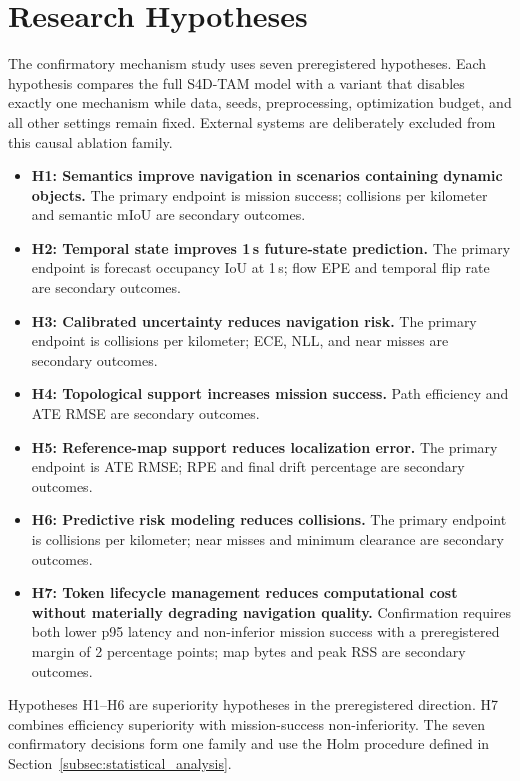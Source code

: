 \section{Research Hypotheses}
\label{sec:hypotheses}

The confirmatory mechanism study uses seven preregistered hypotheses. Each hypothesis compares the full S4D-TAM model with a variant that disables exactly one mechanism while data, seeds, preprocessing, optimization budget, and all other settings remain fixed. External systems are deliberately excluded from this causal ablation family.

\begin{itemize}
  \item \textbf{H1: Semantics improve navigation in scenarios containing dynamic objects.} The primary endpoint is mission success; collisions per kilometer and semantic mIoU are secondary outcomes.
  \item \textbf{H2: Temporal state improves 1\,s future-state prediction.} The primary endpoint is forecast occupancy IoU at 1\,s; flow EPE and temporal flip rate are secondary outcomes.
  \item \textbf{H3: Calibrated uncertainty reduces navigation risk.} The primary endpoint is collisions per kilometer; ECE, NLL, and near misses are secondary outcomes.
  \item \textbf{H4: Topological support increases mission success.} Path efficiency and ATE RMSE are secondary outcomes.
  \item \textbf{H5: Reference-map support reduces localization error.} The primary endpoint is ATE RMSE; RPE and final drift percentage are secondary outcomes.
  \item \textbf{H6: Predictive risk modeling reduces collisions.} The primary endpoint is collisions per kilometer; near misses and minimum clearance are secondary outcomes.
  \item \textbf{H7: Token lifecycle management reduces computational cost without materially degrading navigation quality.} Confirmation requires both lower p95 latency and non-inferior mission success with a preregistered margin of 2 percentage points; map bytes and peak RSS are secondary outcomes.
\end{itemize}

Hypotheses H1--H6 are superiority hypotheses in the preregistered direction. H7 combines efficiency superiority with mission-success non-inferiority. The seven confirmatory decisions form one family and use the Holm procedure defined in Section~\ref{subsec:statistical_analysis}.
